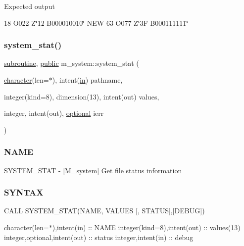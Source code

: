 Expected output

18 O\textquotesingle{}022\textquotesingle{} Z\char`\"{}12\textquotesingle{} B\textquotesingle{}000010010\char`\"{} N\+EW 63 O\textquotesingle{}077\textquotesingle{} Z\char`\"{}3\+F\textquotesingle{} B\textquotesingle{}000111111\char`\"{} \mbox{\label{namespacem__system_a5bb1ebcebe181e07fd24e908cacc9887}} 
\subsubsection{\texorpdfstring{system\+\_\+stat()}{system\_stat()}}
{\footnotesize\ttfamily \hyperlink{M__stopwatch_83_8txt_acfbcff50169d691ff02d4a123ed70482}{subroutine}, \hyperlink{M__stopwatch_83_8txt_a2f74811300c361e53b430611a7d1769f}{public} m\+\_\+system\+::system\+\_\+stat (\begin{DoxyParamCaption}\item[{\hyperlink{option__stopwatch_83_8txt_abd4b21fbbd175834027b5224bfe97e66}{character}(len=$\ast$), intent(\hyperlink{M__journal_83_8txt_afce72651d1eed785a2132bee863b2f38}{in})}]{pathname,  }\item[{integer(kind=8), dimension(13), intent(out)}]{values,  }\item[{integer, intent(out), \hyperlink{option__stopwatch_83_8txt_aa4ece75e7acf58a4843f70fe18c3ade5}{optional}}]{ierr }\end{DoxyParamCaption})}



\subsubsection*{N\+A\+ME}

S\+Y\+S\+T\+E\+M\+\_\+\+S\+T\+AT -\/ \mbox{[}M\+\_\+system\mbox{]} Get file status information 

\subsubsection*{S\+Y\+N\+T\+AX}

C\+A\+LL S\+Y\+S\+T\+E\+M\+\_\+\+S\+T\+A\+T(\+N\+A\+M\+E, V\+A\+L\+U\+E\+S \mbox{[}, S\+T\+A\+T\+U\+S\mbox{]},\mbox{[}\+D\+E\+B\+U\+G\mbox{]})

character(len=$\ast$),intent(in) \+:\+: N\+A\+ME integer(kind=8),intent(out) \+:\+: values(13) integer,optional,intent(out) \+:\+: status integer,intent(in) \+:\+: debug

